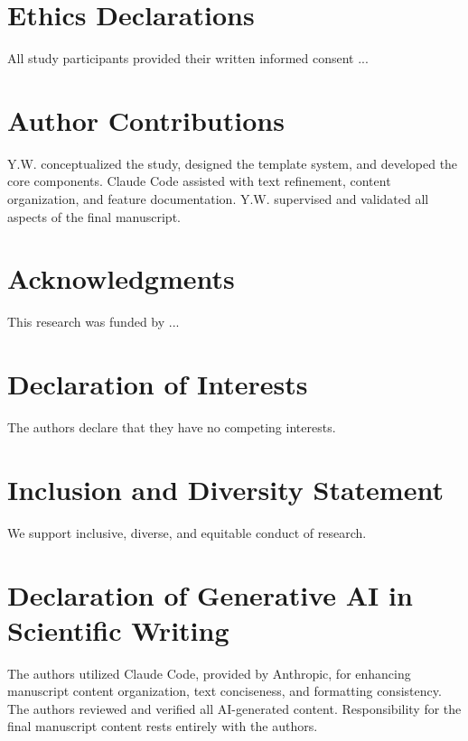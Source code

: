 
\section*{Ethics Declarations}
All study participants provided their written informed consent ...
\label{ethics declarations}

\section*{Author Contributions}
Y.W. conceptualized the study, designed the template system, and developed the core components. Claude Code assisted with text refinement, content organization, and feature documentation. Y.W. supervised and validated all aspects of the final manuscript.
\label{author contributions}

\section*{Acknowledgments}
This research was funded by ...
\label{acknowledgments}

\section*{Declaration of Interests}
The authors declare that they have no competing interests.
\label{declaration of interests}

\section*{Inclusion and Diversity Statement}
We support inclusive, diverse, and equitable conduct of research.
\label{inclusion and diversity statement}

\section*{Declaration of Generative AI in Scientific Writing}
The authors utilized Claude Code, provided by Anthropic, for enhancing manuscript content organization, text conciseness, and formatting consistency. The authors reviewed and verified all AI-generated content. Responsibility for the final manuscript content rests entirely with the authors.
\label{declaration of generative ai in scientific writing}


